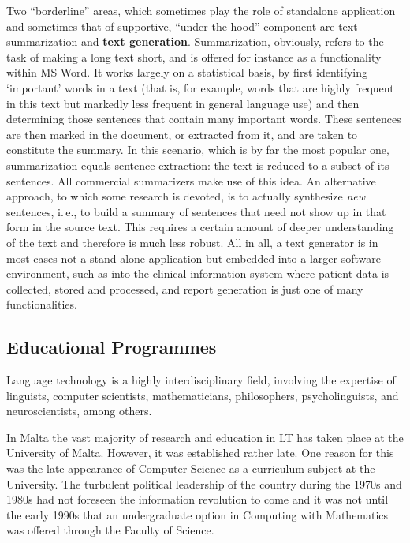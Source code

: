\documentclass[]{../../metanetpaper}
\begin{document}
\begin{multicols}{2}
Two ``borderline'' areas, which sometimes play the role of standalone application and sometimes that of supportive, ``under the hood'' component are text summarization and \textbf{text generation}. Summarization, obviously, refers to the task of making a long text short, and is offered for instance as a functionality within MS Word. It works largely on a statistical basis, by first identifying `important' words in a text (that is, for example, words that are highly frequent in this text but markedly less frequent in general language use) and then determining those sentences that contain many important words. These sentences are then marked in the document, or extracted from it, and are taken to constitute the summary. In this scenario, which is by far the most popular one, summarization equals sentence extraction: the text is reduced to a subset of its sentences. All commercial summarizers make use of this idea. An alternative approach, to which some research is devoted, is to actually synthesize \emph{new} sentences, i.\,e., to build a summary of sentences that need not show up in that form in the source text. This requires a certain amount of deeper understanding of the text and therefore is much less robust. All in all, a text generator is in most cases not a stand-alone application but embedded into a larger software environment, such as into the clinical information system where patient data is collected, stored and processed, and report generation is just one of many functionalities.

\subsection{Educational Programmes}

Language technology is a highly interdisciplinary field, involving the expertise of linguists, computer scientists, mathematicians, philosophers, psycholinguists, and neuroscientists, among others. 

In Malta the vast majority of research and education in LT has taken place at the University of Malta. However, it was established rather late. One reason for this was the late appearance of Computer Science as a curriculum subject at the University. The turbulent political leadership of the country during the 1970s and 1980s had not foreseen the information revolution to come and it was not until the early 1990s that an undergraduate option in Computing with Mathematics was offered through the Faculty of Science. 


\end{multicols}
\end{document}
